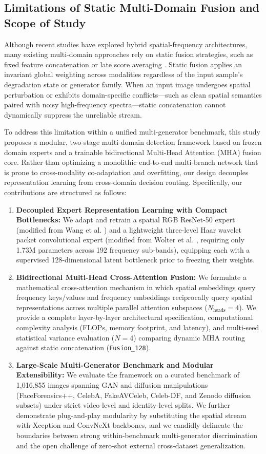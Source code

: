 \documentclass[fleqn,10pt]{wlscirep}
\begin{document}
\subsection*{Limitations of Static Multi-Domain Fusion and Scope of Study}
Although recent studies have explored hybrid spatial-frequency architectures, many existing multi-domain approaches rely on static fusion strategies, such as fixed feature concatenation or late score averaging \cite{ref6, ref7}. Static fusion applies an invariant global weighting across modalities regardless of the input sample's degradation state or generator family. When an input image undergoes spatial perturbation or exhibits domain-specific conflicts---such as clean spatial semantics paired with noisy high-frequency spectra---static concatenation cannot dynamically suppress the unreliable stream.

To address this limitation within a unified multi-generator benchmark, this study proposes a modular, two-stage multi-domain detection framework based on frozen domain experts and a trainable bidirectional Multi-Head Attention (MHA) fusion core. Rather than optimizing a monolithic end-to-end multi-branch network that is prone to cross-modality co-adaptation and overfitting, our design decouples representation learning from cross-domain decision routing. Specifically, our contributions are structured as follows:
\begin{enumerate}
    \item \textbf{Decoupled Expert Representation Learning with Compact Bottlenecks:} We adapt and retrain a spatial RGB ResNet-50 expert (modified from Wang et al. \cite{ref4}) and a lightweight three-level Haar wavelet packet convolutional expert (modified from Wolter et al. \cite{ref8}, requiring only 1.73M parameters across 192 frequency sub-bands), equipping each with a supervised 128-dimensional latent bottleneck prior to freezing their weights.
    \item \textbf{Bidirectional Multi-Head Cross-Attention Fusion:} We formulate a mathematical cross-attention mechanism in which spatial embeddings query frequency keys/values and frequency embeddings reciprocally query spatial representations across multiple parallel attention subspaces ($N_{\text{heads}}=4$). We provide a complete layer-by-layer architectural specification, computational complexity analysis (FLOPs, memory footprint, and latency), and multi-seed statistical variance evaluation ($N=4$) comparing dynamic MHA routing against static concatenation (\texttt{Fusion\_128}).
    \item \textbf{Large-Scale Multi-Generator Benchmark and Modular Extensibility:} We evaluate the framework on a curated benchmark of 1,016,855 images spanning GAN and diffusion manipulations (FaceForensics++, CelebA, FakeAVCeleb, Celeb-DF, and Zenodo diffusion subsets) under strict video-level and identity-level splits. We further demonstrate plug-and-play modularity by substituting the spatial stream with Xception and ConvNeXt backbones, and we candidly delineate the boundaries between strong within-benchmark multi-generator discrimination and the open challenge of zero-shot external cross-dataset generalization.
\end{enumerate}
\end{document}
